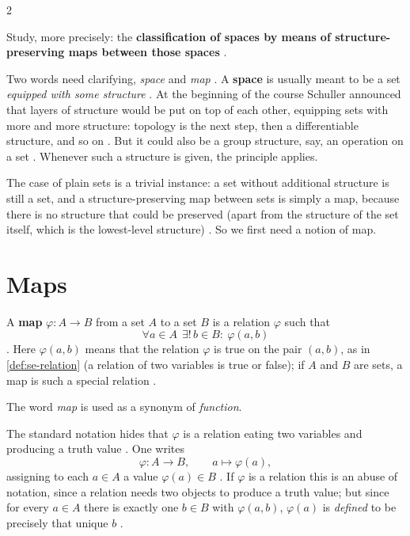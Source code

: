 \begin{paracol}{2}
\begin{intuition}\label{int:cl-theme}
Study, more precisely: the \textbf{classification of spaces by means of structure-preserving maps between those
spaces} .
\end{intuition}

Two words need clarifying, \emph{space} and \emph{map} . A \textbf{space} is usually meant to be a set
\emph{equipped with some structure} . At the beginning of the course Schuller announced that layers of
structure would be put on top of each other, equipping sets with more and more structure: topology is the next step,
then a differentiable structure, and so on . But it could also be a group structure, say, an operation on
a set . Whenever such a structure is given, the principle applies.

The case of plain sets is a trivial instance: a set without additional structure is still a set, and a
structure-preserving map between sets is simply a map, because there is no structure that could be preserved (apart
from the structure of the set itself, which is the lowest-level structure) . So we first need
a notion of map.

\section{Maps}\label{sec:cl-maps}

\begin{definition}\label{def:cl-map}
A \textbf{map} $\varphi\colon A\to B$ from a set $A$ to a set $B$ is a relation $\varphi$ such that
\[
  \forall a\in A\ \ \exists!\, b\in B\colon\ \varphi(a,b)
\]
. Here $\varphi(a,b)$ means that the relation $\varphi$ is true on the pair $(a,b)$, as in
\cref{def:se-relation} (a relation of two variables is true or false); if $A$ and $B$ are sets, a map is such a special
relation .
\end{definition}
The word \emph{map} is used as a synonym of \emph{function}.

The standard notation hides that $\varphi$ is a relation eating two variables and producing a truth value
. One writes
\[
  \varphi\colon A\to B,\qquad a\mapsto\varphi(a),
\]
assigning to each $a\in A$ a value $\varphi(a)\in B$ . If $\varphi$ is a relation this is an abuse of
notation, since a relation needs two objects to produce a truth value; but since for every $a\in A$ there is exactly one
$b\in B$ with $\varphi(a,b)$, $\varphi(a)$ is \emph{defined} to be precisely that unique $b$ .


\end{paracol}
